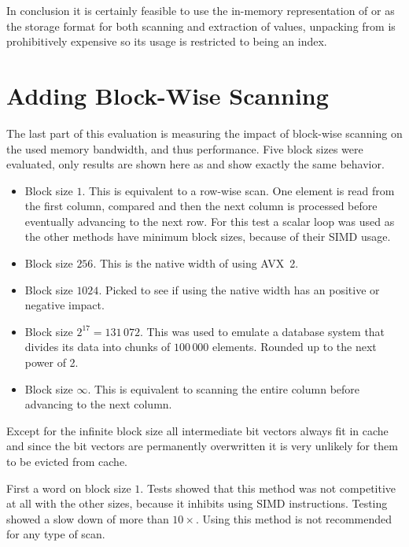 In conclusion it is certainly feasible to use the in-memory representation of
\simdscan{} or \bs{} as the storage format for both scanning and extraction of
values, unpacking from \bwv{} is prohibitively expensive so its usage is
restricted to being an index.

\section{Adding Block-Wise Scanning}

The last part of this evaluation is measuring the impact of block-wise scanning
on the used memory bandwidth, and thus performance. Five block sizes were
evaluated, only \bwv{} results are shown here as \simdscan{} and \bs{} show
exactly the same behavior.

\begin{itemize}
  \item Block size $1$. This is equivalent to a row-wise scan. One element is read
    from the first column, compared and then the next column is processed before
    eventually advancing to the next row. For this test a scalar loop was used
    as the other methods have minimum block sizes, because of their SIMD usage.
  \item Block size $256$. This is the native width of \bwv{} using AVX~2.
  \item Block size $1024$. Picked to see if using the native width has an
    positive or negative impact.
  \item Block size $2^{17}=131\,072$. This was used to emulate a database system
    that divides its data into chunks of $100\,000$ elements. Rounded up to the
    next power of 2.
  \item Block size $\infty$. This is equivalent to scanning the entire column
    before advancing to the next column.
\end{itemize}

Except for the infinite block size all intermediate bit vectors always fit in
cache and since the bit vectors are permanently overwritten it is very unlikely
for them to be evicted from cache.

First a word on block size $1$. Tests showed that this method was not
competitive at all with the other sizes, because it inhibits using SIMD
instructions. Testing showed a slow down of more than $10\times$. Using this
method is not recommended for any type of scan.

